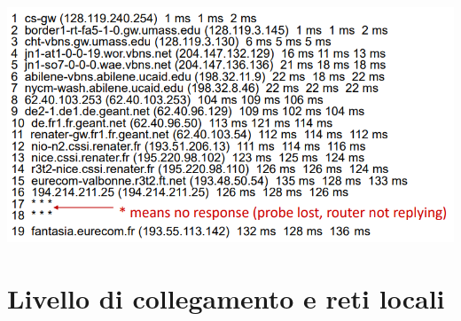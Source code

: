 \documentclass[12pt]{article}
\begin{document}
\begin{center}
    \includegraphics[width =0.75\linewidth]{Images/118.png}
\end{center}
\section{Livello di collegamento e reti locali}
\end{document}
